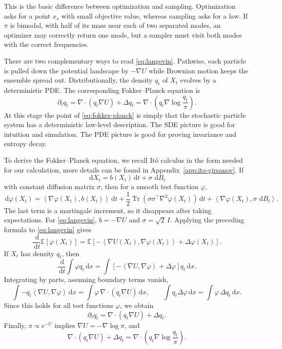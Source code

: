 \documentclass[10pt,a4paper]{amsart}
\numberwithin{equation}{section}
\DeclareMathOperator{\Tr}{Tr}
\newcommand{\E}{\mathbb{E}}
\newcommand{\dd}{\,\mathrm{d}}
\newcommand{\Id}{I}
\newcommand{\ip}[2]{\left\langle #1,#2 \right\rangle}
\begin{document}
This is the basic difference between optimization and sampling.  Optimization
asks for a point $x_\star$ with small objective value, whereas sampling asks for
a law.  If $\pi$ is bimodal, with half of its mass near each of two separated
modes, an optimizer may correctly return one mode, but a sampler must visit both
modes with the correct frequencies.

There are two complementary ways to read \eqref{eq:langevin}.  Pathwise, each
particle is pulled down the potential landscape by $-\nabla U$ while Brownian
motion keeps the ensemble spread out.  Distributionally, the density $q_t$ of
$X_t$ evolves by a deterministic PDE\@.  The corresponding Fokker--Planck
equation is
\begin{equation}\label{eq:fokker-planck}
    \partial_t q_t
    = \nabla\cdot(q_t\nabla U)+\Delta q_t
    = \nabla\cdot\!\left(q_t\nabla\log\frac{q_t}{\pi}\right).
\end{equation}
At this stage the point of \eqref{eq:fokker-planck} is simply that the
stochastic particle system has a deterministic law-level description.  The SDE
picture is good for intuition and simulation.  The PDE picture is good for
proving invariance and entropy decay.

To derive the Fokker--Planck equation, we recall It\^o calculus in the form needed for our
calculation, more details can be found in Appendix~\ref{app:ito-girsanov}.  If
\[
    \dd X_t=b(X_t)\dd t+\sigma\,\dd B_t
\]
with constant diffusion matrix $\sigma$, then for a smooth test function
$\varphi$,
\[
    \dd \varphi(X_t)
    =
    \ip{\nabla\varphi(X_t)}{b(X_t)}\dd t
    +\frac12\Tr\!\left(\sigma\sigma^\top\nabla^2\varphi(X_t)\right)\dd t
    +\ip{\nabla\varphi(X_t)}{\sigma\,\dd B_t}.
\]
The last term is a martingale increment, so it disappears after taking
expectations.  For \eqref{eq:langevin}, $b=-\nabla U$ and
$\sigma=\sqrt2\,\Id$.
Applying the preceding formula to
\eqref{eq:langevin} gives
\[
    \frac{\dd}{\dd t}\E[\varphi(X_t)]
    =
    \E[-\ip{\nabla U(X_t)}{\nabla\varphi(X_t)}+\Delta\varphi(X_t)].
\]
If $X_t$ has density $q_t$, then
\[
    \frac{\dd}{\dd t}\int \varphi q_t\dd x
    =
    \int\left[-\ip{\nabla U}{\nabla\varphi}+\Delta\varphi\right]q_t\dd x.
\]
Integrating by parts, assuming boundary terms vanish,
\[
    \int -q_t\ip{\nabla U}{\nabla\varphi}\dd x
    =
    \int \varphi\,\nabla\cdot(q_t\nabla U)\dd x,
    \qquad
    \int q_t\Delta\varphi\dd x
    =
    \int \varphi\,\Delta q_t\dd x.
\]
Since this holds for all test functions $\varphi$, we obtain
\[
    \partial_tq_t=\nabla\cdot(q_t\nabla U)+\Delta q_t.
\]
Finally, $\pi\propto e^{-U}$ implies $\nabla U=-\nabla\log\pi$, and
\[
    \nabla\cdot(q_t\nabla U)+\Delta q_t
    =
    \nabla\cdot\left(q_t\nabla\log\frac{q_t}{\pi}\right).
\]
\end{document}
